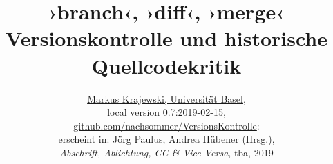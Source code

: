 \documentclass[a4paper,12pt]{article}
\date{}
\newcommand{\inanf}[1]{›#1‹}
\begin{document}
%
% 
\title{\huge\inanf{branch}, \inanf{diff}, \inanf{merge}\\
\normalsize Versionskontrolle und historische Quellcodekritik}
\author{\href{http://gtm.mewi.unibas.ch}{Markus Krajewski, Universität Basel},\\[3mm]
local version 0.7:2019-02-15,\\
\href{https://github.com/nachsommer/VersionsKontrolle/tree/master/1.Fassung}{github.com/nachsommer/VersionsKontrolle}: \gitVer{}\\[3mm]
erscheint in: Jörg Paulus, Andrea Hübener (Hrsg.),\\
\emph{Abschrift, Ablichtung, CC \& Vice Versa}, tba, 2019}
\maketitle
\tableofcontents
\newpage
%
\begin{comment}

6 Abbildungen

Alternativ-Version für Konstanz:

"Assistenzsysteme. Mimetische Praktiken kollektiver Autorschaft zwischen Mensch und Maschine"

Neuer Einstieg: Was sind Assistenzsysteme? Sie überwachen. Hier: die Unterschiede, und zwar die Unterschiede in den Texten.

Welche historischen Vergleiche? Die Korrektoren.

Darüber die Brücke zur Auto(r)Korrektur. Hier die Notwendigkeit, mimetischer Praktiken ins Spiel bringen...

\end{comment}

\noindent 
\end{document}
